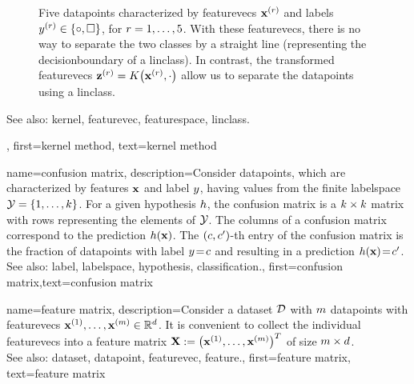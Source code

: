 {{\begin{figure}[H]
\begin{center}
\end{center}
\caption{
Five \glspl{datapoint} characterized by \glspl{featurevec} ${\bf x}^{(r)}$ 
and \glspl{label} $y^{(r)} \in \{ \circ, \square \}$, for $r=1, \ldots, 5$. 
With these \glspl{featurevec}, there is no way to separate the two classes 
by a straight line (representing the \gls{decisionboundary} of a \gls{linclass}). 
In contrast, the transformed \glspl{featurevec} ${\bf z}^{(r)} = K\big({\bf x}^{(r)},\cdot\big)$ 
allow us to separate the \glspl{datapoint} using a \gls{linclass}.  \label{fig_linsep_kernel_dict}}
\end{figure}
		See also: \gls{kernel}, \gls{featurevec}, \gls{featurespace}, \gls{linclass}.},
	first={kernel method},
	text={kernel method} 
}

	

{name={confusion matrix}, 
 description={Consider \glspl{datapoint}, which are characterized 
		by \glspl{feature} ${\bf x}$ and \gls{label} $y$, having values from the finite 
		\gls{labelspace} $\mathcal{Y} = \{1, \ldots, k\}$. For a given \gls{hypothesis} $h$, 
		the confusion matrix is a $k \times k$ matrix with rows representing the elements of 
		$\mathcal{Y}$. The columns of a confusion matrix correspond to the \gls{prediction} $h({\bf x})$. 
		The $(c,c')$-th entry of the confusion matrix is the fraction of 
		\glspl{datapoint} with \gls{label} $y\!=\! c$ and resulting in a \gls{prediction} $h({\bf x})\!=\!c'$.
				\\
		See also: \gls{label}, \gls{labelspace}, \gls{hypothesis}, \gls{classification}.},
	first={confusion matrix},text={confusion matrix} }


{name={feature matrix}, 
	description={Consider a \gls{dataset} $\mathcal{D}$ 
		with $m$ \glspl{datapoint} with \glspl{featurevec} ${\bf x}^{(1)}, \ldots, {\bf x}^{(m)} \in \mathbb{R}^{d}$. It is convenient to 
		collect the individual \glspl{featurevec} into a \gls{feature} 
		matrix ${\bf X} := \big({\bf x}^{(1)}, \ldots, {\bf x}^{(m)}\big)^{T}$ 
		of size $m \times d$.
				\\
		See also: \gls{dataset}, \gls{datapoint}, \gls{featurevec}, \gls{feature}.},
	first={feature matrix},
	text={feature matrix} 
}

